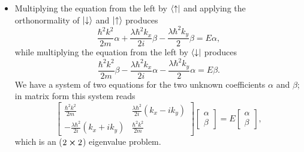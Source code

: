 \documentclass[11pt, a4paper]{article}
\newcommand{\ua}{\uparrow}  %
\newcommand{\da}{\downarrow}  %
\begin{document}
\begin{itemize}
	\item Multiplying the equation from the left by $ \bra{\ua} $ and applying the orthonormality of $ \ket{\da} $ and $ \ket{\ua} $ produces
	\begin{equation*}
		\frac{\hbar^{2}k^{2}}{2m} \alpha + \frac{\lambda \hbar^{2}k_{x}}{2i} \beta - \frac{\lambda \hbar^{2}k_{y}}{2} \beta = E \alpha,
	\end{equation*}
	while multiplying the equation from the left by $ \bra{\da} $ produces
	\begin{equation*}
		\frac{\hbar^{2}k^{2}}{2m} \beta - \frac{\lambda \hbar^{2}k_{x}}{2i} \alpha - \frac{\lambda \hbar^{2}k_{y}}{2} \alpha = E \beta.
	\end{equation*}
	We have a system of two equations for the two unknown coefficients $ \alpha $ and $ \beta $; in matrix form this system reads
	\begin{equation*}
		\begin{bmatrix}
		\frac{\hbar^{2}k^{2}}{2m} & \frac{\lambda \hbar^{2}}{2i}(k_{x}-ik_{y}) \\
		-\frac{\lambda \hbar^{2}}{2i}(k_{x}+ik_{y}) & \frac{\hbar^{2}k^{2}}{2m}
		\end{bmatrix}
		\begin{bmatrix}
			\alpha\\
			\beta
		\end{bmatrix}
		= E
		\begin{bmatrix}
			\alpha\\
			\beta
		\end{bmatrix},
	\end{equation*}
	which is an ($ 2 \cross 2 $) eigenvalue problem.
	

\end{itemize}
\end{document}
